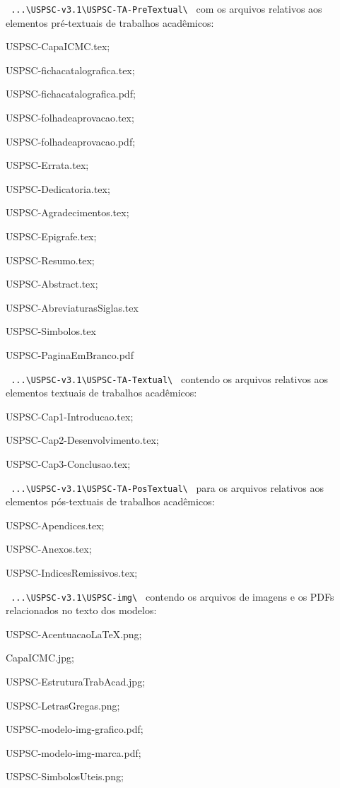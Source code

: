 \begin{alineas}
	\item \verb+ ...\USPSC-v3.1\USPSC-TA-PreTextual\ + com os arquivos relativos aos elementos pr\'e-textuais de trabalhos acad\^emicos:
		\begin{alineas}
				\item USPSC-CapaICMC.tex;
				\item USPSC-fichacatalografica.tex;
				\item USPSC-fichacatalografica.pdf;
				\item USPSC-folhadeaprovacao.tex;
				\item USPSC-folhadeaprovacao.pdf;
				\item USPSC-Errata.tex;
				\item USPSC-Dedicatoria.tex;
				\item USPSC-Agradecimentos.tex;
				\item USPSC-Epigrafe.tex;
				\item USPSC-Resumo.tex;
				\item USPSC-Abstract.tex;
				\item USPSC-AbreviaturasSiglas.tex
				\item USPSC-Simbolos.tex 
				\item USPSC-PaginaEmBranco.pdf
			\end{alineas}
			
	\item \verb+ ...\USPSC-v3.1\USPSC-TA-Textual\ + contendo os arquivos relativos aos elementos textuais de trabalhos acad\^emicos:
		\begin{alineas}
			\item USPSC-Cap1-Introducao.tex;
			\item USPSC-Cap2-Desenvolvimento.tex;
			\item USPSC-Cap3-Conclusao.tex;
		\end{alineas}
		
	\item \verb+ ...\USPSC-v3.1\USPSC-TA-PosTextual\ + para os arquivos relativos aos elementos pós-textuais de trabalhos acad\^emicos:	
		\begin{alineas}
			\item USPSC-Apendices.tex;
			\item USPSC-Anexos.tex;
			\item USPSC-IndicesRemissivos.tex;
		\end{alineas}
	
	\item \verb+ ...\USPSC-v3.1\USPSC-img\ + contendo os arquivos de imagens e os PDFs relacionados no texto dos modelos: 
		\begin{alineas}	
			\item USPSC-AcentuacaoLaTeX.png;
			\item CapaICMC.jpg;
			\item USPSC-EstruturaTrabAcad.jpg;
			\item USPSC-LetrasGregas.png;
			\item USPSC-modelo-img-grafico.pdf;
			\item USPSC-modelo-img-marca.pdf;
			\item USPSC-SimbolosUteis.png;
		\end{alineas}	
	

\end{alineas}
